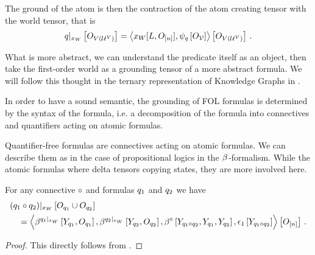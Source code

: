 The ground of the atom is then the contraction of the atom creating tensor with the world tensor, that is
\begin{align*}
    {q}|_{x_{W}} \left[O_{V(\mathcal{U}^{V})}\right]
    = \left\langle x_{W}[L,O_{[n]}], \psi_{q}\left[O_{\mathcal{V}}\right]\right\rangle \left[ O_{V(\mathcal{U}^{V})} \right] \, .
\end{align*}


What is more abstract, we can understand the predicate itself as an object, then take the first-order world as a grounding tensor of a more abstract formula.
We will follow this thought in the ternary representation of Knowledge Graphs in .




\label{sec:folConnectiveRepresentation}

In order to have a sound semantic, the grounding of FOL formulas is determined by the syntax of the formula, i.e. a decomposition of the formula into connectives and quantifiers acting on atomic formulas.

Quantifier-free formulas are connectives acting on atomic formulas.
We can describe them as in the case of propositional logics in the $\beta^{}$-formalism.
While the atomic formulas where delta tensors copying states, they are more involved here.



\begin{theorem}
    For any connective $\circ$ and formulas $q_1$ and $q_2$ we have
    \begin{align}
        &{(q_1\circ q_2)}|_{x_{W}} \left[O_{q_1}\cup O_{q_2}\right] \\
        &\quad=
        \left\langle 
            \beta^{{q_1}|_{x_{W}}}\left[Y_{q_1},O_{q_1}\right],
            \beta^{{q_2}|_{x_{W}}}\left[Y_{q_2},O_{q_2}\right],
            \beta^{\circ}\left[Y_{q_1\circ q_2}, Y_{q_1}, Y_{q_2}\right],
            \epsilon_1\left[Y_{q_1\circ q_2}\right]
        \right\rangle \left[ O_{[n]} \right] \, .
    \end{align}
\end{theorem}
\begin{proof}
    This directly follows from .
\end{proof}

